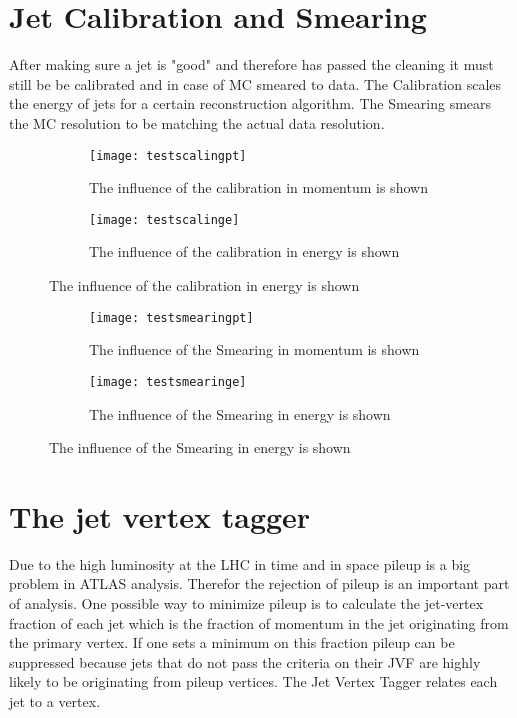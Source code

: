 \section{Jet Calibration and Smearing}

After making sure a jet is "good" and therefore has passed the cleaning it must still be be calibrated and in case of MC smeared to data. The Calibration scales the energy of jets for a certain reconstruction algorithm. The Smearing smears the MC resolution to be matching the actual data resolution.


\begin{figure}
\centering
\begin{subfigure}[b]{0.5\figwidth}
\texttt{[image: testscalingpt]}
\caption[Influence of the JES on the transversal momentum]{The influence of the calibration in momentum is shown}
\label{fig:testscalingpt}
\end{subfigure}
\begin{subfigure}[b]{0.5\figwidth}
\texttt{[image: testscalinge]}
\caption[Influence of the JES on the energy]{The influence of the calibration in energy is shown}
\label{fig:testscalinge}
\end{subfigure}
\end{figure}


\begin{figure}
\centering
\begin{subfigure}[b]{0.5\figwidth}
\texttt{[image: testsmearingpt]}
\caption[Influence of the Smearing on the transversal momentum]{The influence of the Smearing in momentum is shown}
\label{fig:testsmearingpt}
\end{subfigure}
\begin{subfigure}[b]{0.5\figwidth}
\texttt{[image: testsmearinge]}
\caption[Influence of the Smearing on the energy]{The influence of the Smearing in energy is shown}
\label{fig:testsmearinge}
\end{subfigure}
\end{figure}



\section{The jet vertex tagger}

Due to the high luminosity at the LHC in time and in space pileup is a big problem in ATLAS analysis. Therefor the rejection of pileup is an important part of analysis. One possible way to minimize pileup is to calculate the jet-vertex fraction of each jet which is the fraction of momentum in the jet originating from the primary vertex. If one sets a minimum on this fraction pileup can be suppressed because jets that do not pass the criteria on their JVF are highly likely to be originating from pileup vertices. The Jet Vertex Tagger relates each jet to a vertex.

